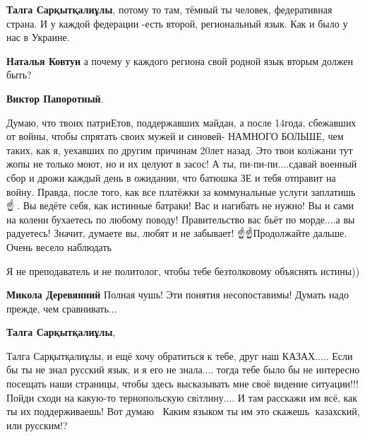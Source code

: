 \begin{itemize}
\begin{itemize}
\textbf{Талга Сарқытқалиұлы}, потому то там, тёмный ты человек, федеративная страна. И у каждой федерации -есть второй, региональный язык. Как и было у нас в Украине.

\textbf{Наталья Ковтун} а почему у каждого региона свой родной язык вторым должен быть?


\textbf{Виктор Папоротный}. 

Думаю, что твоих патриЕтов, поддержавших майдан, а после 14года, сбежавших от
войны, чтобы спрятать своих мужей и синовей- НАМНОГО БОЛЬШЕ, чем таких, как я,
уехавших по другим причинам 20лет назад. Это твои колiжани тут жопы не только
моют, но и их целуют в засос! А ты, пи-пи-пи....сдавай военный сбор и дрожи
каждый день в ожидании, что батюшка ЗЕ и тебя отправит на войну. Правда, после
того, как все платёжки за коммунальные услуги заплатишь☝️🤪. Вы ведёте себя, как
истинные батраки! Вас и нагибать не нужно! Вы и сами на колени бухаетесь по
любому поводу! Правительство вас бьёт по морде....а вы радуетесь! Значит,
думаете вы, любят и не забывает! ☝️☝️Продолжайте дальше. Очень весело
наблюдать🤪🤪🤪

Я не преподаватель и не политолог, чтобы тебе безтолковому объяснять истины))

\textbf{Микола Деревянний} Полная чушь! Эти понятия несопоставимы! Думать надо прежде, чем сравнивать...


\textbf{Талга Сарқытқалиұлы}, 

Талга Сарқытқалиұлы, и ещё хочу обратиться к тебе, друг наш КАЗАХ..... Если бы
ты не знал русский язык, и я его не знала.... тогда тебе было бы не интересно
посещать наши страницы, чтобы здесь высказывать мне своё видение ситуации!!!
Пойди сходи на какую-то тернопольскую свiтлину.... И там расскажи им всё, как
ты их поддерживаешь! Вот думаю 🤔🤔Каким языком ты им это скажешь 🤔казахский,
или русским!? 👊👏👏



\end{itemize}
\end{itemize}
